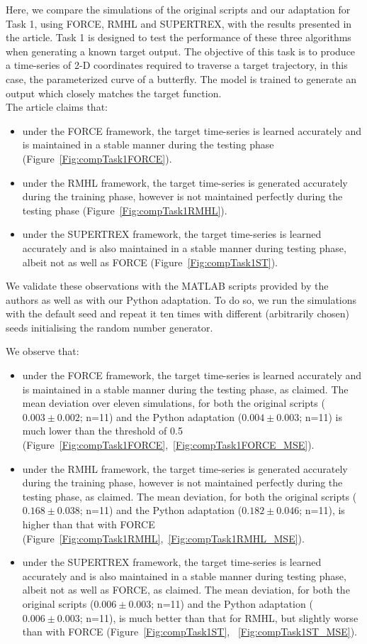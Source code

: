 Here, we compare the simulations of the original scripts and our adaptation for Task 1, using FORCE, RMHL and SUPERTREX, with the results presented in the article. Task 1 is designed to test the performance of these three algorithms when generating a known target output. The objective of this task is to produce a time-series of 2-D coordinates required to traverse a target trajectory, in this case, the parameterized curve of a butterfly. The model is trained to generate an output which closely matches the target function. \\ 

The article claims that:
\begin{itemize}
\item under the FORCE framework, the target time-series is learned accurately and is maintained in a stable manner during the testing phase (Figure~\ref{Fig:compTask1FORCE}).
\item under the RMHL framework, the target time-series is generated accurately during the training phase, however is not maintained perfectly during the testing phase (Figure~\ref{Fig:compTask1RMHL}).
\item under the SUPERTREX framework, the target time-series is learned accurately and is also maintained in a stable manner during testing phase, albeit not as well as FORCE (Figure~\ref{Fig:compTask1ST}).
\end{itemize}

We validate these observations with the MATLAB scripts provided by the authors as well as with our Python adaptation. To do so, we run the simulations with the default seed and repeat it ten times with different (arbitrarily chosen) seeds initialising the random number generator.  


We observe that:
\begin{itemize}
\item under the FORCE framework, the target time-series is learned accurately and is maintained in a stable manner during the testing phase, as claimed. The mean deviation over eleven simulations, for both the original scripts ($0.003\pm0.002$; n=11) and the Python adaptation ($0.004\pm0.003$; n=11) is much lower than the threshold of 0.5 (Figure~\ref{Fig:compTask1FORCE},~\ref{Fig:compTask1FORCE_MSE}).
\item under the RMHL framework, the target time-series is generated accurately during the training phase, however is not maintained perfectly during the testing phase, as claimed. The mean deviation, for both the original scripts ($0.168\pm0.038$; n=11) and the Python adaptation ($0.182\pm0.046$; n=11), is higher than that with FORCE (Figure~\ref{Fig:compTask1RMHL},~\ref{Fig:compTask1RMHL_MSE}).
\item under the SUPERTREX framework, the target time-series is learned accurately and is also maintained in a stable manner during testing phase, albeit not as well as FORCE, as claimed. The mean deviation, for both the original scripts ($0.006\pm0.003$; n=11) and the Python adaptation ($0.006\pm0.003$; n=11), is much better than that for RMHL, but slightly worse than with FORCE (Figure~\ref{Fig:compTask1ST}, ~\ref{Fig:compTask1ST_MSE}).

\end{itemize}

